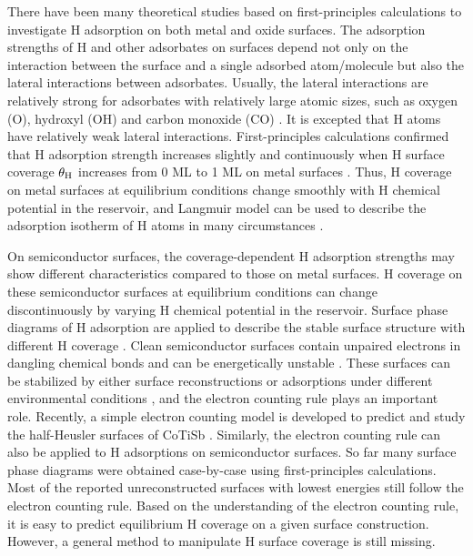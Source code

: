 There have been many theoretical studies based on first-principles calculations to investigate H adsorption on both metal and oxide surfaces.  The adsorption strengths of H and other adsorbates on surfaces depend not only on the interaction between the surface and a single adsorbed atom/molecule but also the lateral interactions between adsorbates. Usually, the lateral interactions are relatively strong for adsorbates with relatively large atomic sizes, such as oxygen (O), hydroxyl (OH) and carbon monoxide (CO) \cite{Miller09,qi2012adsorbate}. It is excepted that H atoms have relatively weak lateral interactions. First-principles calculations confirmed that H adsorption strength increases slightly and continuously when H surface coverage $\theta_{\textup{H}}$ increases from 0 \ac{ML} to 1 \ac{ML} on metal surfaces \cite{pallassana1999theoretical}. Thus, H coverage on metal surfaces at equilibrium conditions change smoothly with H chemical potential in the reservoir, and Langmuir model can be used to describe the adsorption isotherm of H atoms in many circumstances \cite{Benard01}.

On semiconductor surfaces, the coverage-dependent H adsorption strengths may show different characteristics compared to those on metal surfaces. H coverage on these semiconductor surfaces at equilibrium conditions can change discontinuously by varying H chemical potential in the reservoir. Surface phase diagrams of H adsorption are applied to describe the stable surface structure with different H coverage \cite{deWalle02GaN,wang2005hydrogen,lauritsen2011stabilization}. Clean semiconductor surfaces contain unpaired electrons in dangling chemical bonds and can be energetically unstable \cite{Harrison79, dulub2003novel,wander2001stability,hellstrom2017surface,calzolari2013dipolar}. These surfaces can be stabilized by either surface reconstructions or adsorptions under different environmental conditions \cite{Kaxiras87, meyer2004first,lauritsen2011stabilization,wahl2013stabilization,valtiner2009temperature,Jacobs16ZnO}, and the electron counting rule \cite{pashley1989electron} plays an important role. Recently, a simple electron counting model is developed to predict and study the half-Heusler surfaces of CoTiSb \cite{kawasaki2018simple}. Similarly, the electron counting rule can also be applied to H adsorptions on semiconductor surfaces. So far many surface phase diagrams were obtained case-by-case using first-principles calculations. Most of the reported unreconstructed surfaces with lowest energies \cite{meyer2004first,valtiner2009temperature,Jacobs16ZnO} still follow the electron counting rule. Based on the understanding of the electron counting rule, it is easy to predict equilibrium H coverage on a given surface construction. However, a general method to manipulate H surface coverage is still missing.

